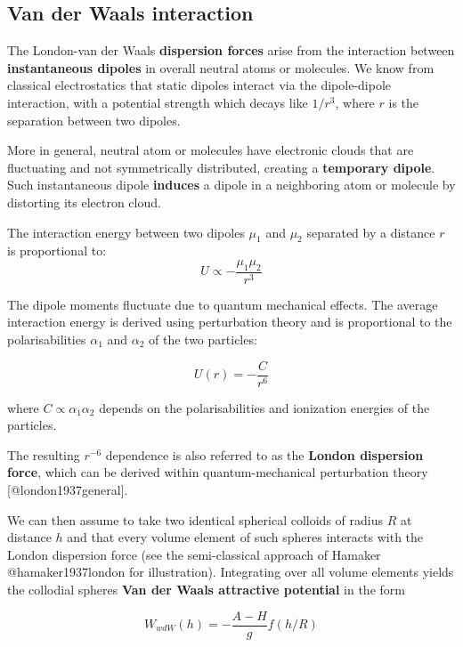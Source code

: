 \documentclass[
  letterpaper,
  enabledeprecatedfontcommands]{report}
\begin{document}
\subsection{Van der Waals interaction}\label{van-der-waals-interaction}

The London-van der Waals \textbf{dispersion forces} arise from the
interaction between \textbf{instantaneous dipoles} in overall neutral
atoms or molecules. We know from classical electrostatics that static
dipoles interact via the dipole-dipole interaction, with a potential
strength which decays like \(1/r^3\), where \(r\) is the separation
between two dipoles.

More in general, neutral atom or molecules have electronic clouds that
are fluctuating and not symmetrically distributed, creating a
\textbf{temporary dipole}. Such instantaneous dipole \textbf{induces} a
dipole in a neighboring atom or molecule by distorting its electron
cloud.

The interaction energy between two dipoles \(\mu_1\) and \(\mu_2\)
separated by a distance \(r\) is proportional to: \[
U \propto -\frac{\mu_1 \mu_2}{r^3}
\]

\marginnote{\begin{footnotesize}

\end{footnotesize}}

The dipole moments fluctuate due to quantum mechanical effects. The
average interaction energy is derived using perturbation theory and is
proportional to the polarisabilities \(\alpha_1\) and \(\alpha_2\) of
the two particles:

\[
    U(r) = -\frac{C}{r^6}
\]

where \(C \propto \alpha_1 \alpha_2\) depends on the polarisabilities
and ionization energies of the particles.

The resulting \(r^{-6}\) dependence is also referred to as the
\textbf{London dispersion force}, which can be derived within
quantum-mechanical perturbation theory {[}@london1937general{]}.

We can then assume to take two identical spherical colloids of radius
\(R\) at distance \(h\) and that every volume element of such spheres
interacts with the London dispersion force (see the semi-classical
approach of Hamaker @hamaker1937london for illustration). Integrating
over all volume elements yields the collodial spheres \textbf{Van der
Waals attractive potential} in the form

\[W_{wdW}(h)=-\dfrac{A-H}{g}f(h/R)\]
\end{document}
